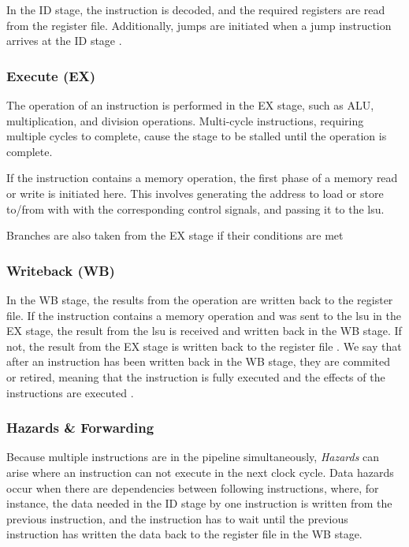 In the ID stage, the instruction is decoded, and the required registers are read from the register file. Additionally, jumps are initiated when a jump instruction arrives at the ID stage \cite{openhwgroupPipelineDetails2023}. 

\subsubsection{Execute (EX)}

The operation of an instruction is performed in the EX stage, such as ALU, multiplication, and division operations. Multi-cycle instructions, requiring multiple cycles to complete, cause the stage to be stalled until the operation is complete.

If the instruction contains a memory operation, the first phase of a memory read or write is initiated here. This involves generating the address to load or store to/from with with the corresponding control signals, and passing it to the \acrshort{lsu}.

Branches are also taken from the EX stage if their conditions are met \cite{openhwgroupPipelineDetails2023}

\subsubsection{Writeback (WB)}

In the WB stage, the results from the operation are written back to the register file. 
If the instruction contains a memory operation and was sent to the \acrshort{lsu} in the EX stage, the result from the \acrshort{lsu} is received and written back in the WB stage. If not, the result from the EX stage is written back to the register file \cite{openhwgroupPipelineDetails2023}.
We say that after an instruction has been written back in the WB stage, they are \gls{commited} or \gls{retired}, meaning that the instruction is fully executed and the effects of the instructions are executed \cite{taylorAdvancedRISCVVerification2023}. 


\subsubsection{Hazards \& Forwarding}

Because multiple instructions are in the pipeline simultaneously, \textit{Hazards} can arise where an instruction can not execute in the next clock cycle. Data hazards occur when there are dependencies between following instructions, where, for instance, the data needed in the ID stage by one instruction is written from the previous instruction, and the instruction has to wait until the previous instruction has written the data back to the register file in the WB stage.

